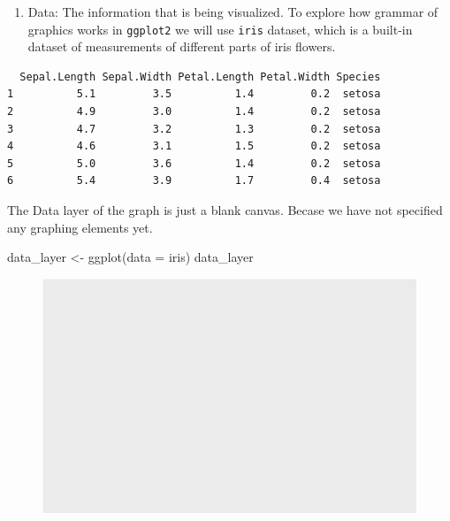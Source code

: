 \documentclass[
  letterpaper,
]{book}
\newenvironment{Shaded}{\begin{snugshade}}{\end{snugshade}}
\newcommand{\AttributeTok}[1]{\textcolor[rgb]{0.40,0.45,0.13}{#1}}
\newcommand{\FunctionTok}[1]{\textcolor[rgb]{0.28,0.35,0.67}{#1}}
\newcommand{\NormalTok}[1]{\textcolor[rgb]{0.00,0.23,0.31}{#1}}
\newcommand{\OtherTok}[1]{\textcolor[rgb]{0.00,0.23,0.31}{#1}}
\providecommand{\tightlist}{%
  \setlength{\itemsep}{0pt}\setlength{\parskip}{0pt}}\usepackage{longtable,booktabs,array}
\begin{document}
\begin{enumerate}
\def\labelenumi{\arabic{enumi}.}
\tightlist
\item
  Data: The information that is being visualized. To explore how grammar
  of graphics works in \texttt{ggplot2} we will use \texttt{iris}
  dataset, which is a built-in dataset of measurements of different
  parts of iris flowers.
\end{enumerate}

\begin{verbatim}
  Sepal.Length Sepal.Width Petal.Length Petal.Width Species
1          5.1         3.5          1.4         0.2  setosa
2          4.9         3.0          1.4         0.2  setosa
3          4.7         3.2          1.3         0.2  setosa
4          4.6         3.1          1.5         0.2  setosa
5          5.0         3.6          1.4         0.2  setosa
6          5.4         3.9          1.7         0.4  setosa
\end{verbatim}

The Data layer of the graph is just a blank canvas. Becase we have not
specified any graphing elements yet.

\begin{Shaded}
\begin{Highlighting}[]
\NormalTok{data\_layer }\OtherTok{\textless{}{-}} \FunctionTok{ggplot}\NormalTok{(}\AttributeTok{data =}\NormalTok{ iris)}
\NormalTok{data\_layer}
\end{Highlighting}
\end{Shaded}

\begin{figure}[H]

{\centering \includegraphics{./data_viz_files/figure-pdf/unnamed-chunk-6-1.pdf}

}

\end{figure}
\end{document}
